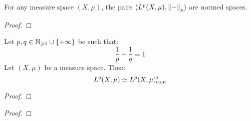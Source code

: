         \begin{lemma} \label{lemma: minkowski_inequality}
            For any measure space $(X, \mu)$, the pairs $(L^p(X, \mu), \left\| {-} \right\|_p)$ are normed spaces.
        \end{lemma}
            \begin{proof}
            \end{proof}
        \begin{theorem} \label{theorem: L_p_space_duality}
            Let $p, q \in \mathbb{N}_{\geqslant 1} \cup \{+\infty\}$ be such that:
                $$\frac1p + \frac1q = 1$$
            Let $(X, \mu)$ be a measure space. Then:
                $$L^q(X, \mu) \simeq L^p(X, \mu)^*_{\mathrm{cont}}$$
        \end{theorem}
            \begin{proof}
                
            \end{proof}
        \begin{theorem} \label{theorem: L_p_space_completeness}
            
        \end{theorem}
            \begin{proof}
                
            \end{proof}
